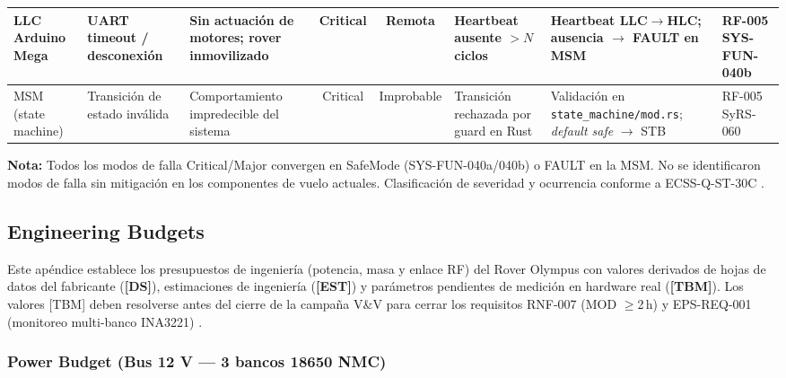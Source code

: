 \begin{landscape}
\begin{longtable}{| l | p{2.4cm} | p{2.8cm} | c | c | p{2.6cm} | p{3.8cm} | l |}
LLC Arduino Mega &
UART timeout / desconexión &
Sin actuación de motores; rover inmovilizado &
Critical & Remota &
Heartbeat ausente $>N$ ciclos &
Heartbeat LLC$\rightarrow$HLC; ausencia $\rightarrow$ FAULT en MSM &
RF-005 \newline SYS-FUN-040b \\ \hline

MSM \newline (state machine) &
Transición de estado inválida &
Comportamiento impredecible del sistema &
Critical & Improbable &
Transición rechazada por guard en Rust &
Validación en \texttt{state\_machine/mod.rs}; \textit{default safe} $\rightarrow$ STB &
RF-005 \newline SyRS-060 \\ \hline

\end{longtable}
\end{landscape}

\textbf{Nota:} Todos los modos de falla Critical/Major convergen en SafeMode (SYS-FUN-040a/040b) o FAULT en la MSM. No se identificaron modos de falla sin mitigación en los componentes de vuelo actuales. Clasificación de severidad y ocurrencia conforme a ECSS-Q-ST-30C \cite{ecss_q_st_30}.

\subsection{Engineering Budgets}\label{subsec:eng_budgets}

Este apéndice establece los presupuestos de ingeniería (potencia, masa y enlace RF) del Rover Olympus con valores derivados de hojas de datos del fabricante (\textbf{[DS]}), estimaciones de ingeniería (\textbf{[EST]}) y parámetros pendientes de medición en hardware real (\textbf{[TBM]}). Los valores [TBM] deben resolverse antes del cierre de la campaña V\&V para cerrar los requisitos RNF-007 (MOD $\ge$2\,h) y EPS-REQ-001 (monitoreo multi-banco INA3221) \cite{rpi5_brief, arduino_mega_ds}.

\subsubsection{Power Budget (Bus 12 V — 3 bancos 18650 NMC)}

